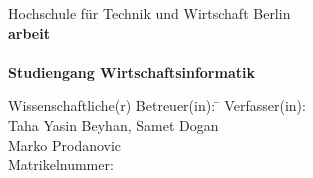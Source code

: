 \begin{titlepage}
\vspace{1em}
\begin{center}
	{\textsf{\large Hochschule für Technik und Wirtschaft Berlin}}\\[4em]
	{\textsf{\textbf{\large{\DieArtDerArbeit}arbeit}}}\\[6mm]
	{\textsf{\textbf{\Large{}\DerTitelDerArbeit}}} \\[1.5cm]
	{\textsf{\textbf{\large{}Studiengang Wirtschaftsinformatik}}\\[6mm]}\vspace{10em}
	
	\begin{minipage}{\textwidth}
		\begin{tabbing}
		Wissenschaftliche(r) Betreuer(in): \hspace{0.85cm}\=\kill
		Verfasser(in): \> \DerAutorDerArbeit \\[1.5mm]
		\> Taha Yasin Beyhan, Samet Dogan \\[1.5mm]
		\> Marko Prodanovic \\[1.5mm]
		Matrikelnummer: \> \DieMatrikelnummer \\[1.5mm]
		\end{tabbing}
	\end{minipage}
\end{center}
\end{titlepage}
